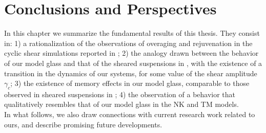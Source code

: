 \chapter{Conclusions and Perspectives}

In this chapter we summarize the fundamental results of this thesis. They consist in: 1) a rationalization of the observations of overaging and rejuvenation in the cyclic shear simulations reported in \cite{lacks2004energy}; 2) the analogy drawn between the behavior of our model glass and that of the sheared suspensions in \cite{corte2008random}, with the existence of a transition in the dynamics of our systems, for some value of the shear amplitude $\gamma_{c}$; 3) the existence of memory effects in our model glass, comparable to those observed in sheared suspensions in \cite{keim2011generic}; 4) the observation of a behavior that qualitatively resembles that of our model glass in the NK and TM models.\\
In what follows, we also draw connections with current research work related to ours, and describe promising future developments.\\


